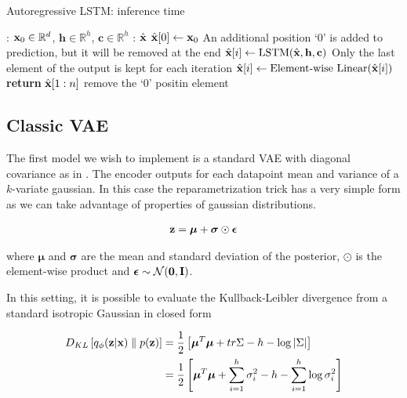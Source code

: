 \documentclass[12pt]{article}
\begin{document}
\begin{algorithm}
    \label{alg:autoregressive_LSTM_inference}
    \caption{Autoregressive LSTM: inference time}
    \begin{algorithmic}
        \Input: \(\textbf{x}_0 \in \mathbb{R}^d\), \(\mathbf{h} \in \mathbb{R}^h\), \(\mathbf{c} \in \mathbb{R}^h\)
        \Output: \(\hat{\textbf{x}}\)
        \State \(\hat{\textbf{x}}[0] \leftarrow \textbf{x}_0\) \Comment An additional position `0' is added to prediction, but it will be removed at the end
            \State \(\hat{\textbf{x}}[i] \leftarrow \text{LSTM}(\hat{\textbf{x}}, \mathbf{h}, \mathbf{c})\) \Comment Only the last element of the output is kept for each iteration
            \State \(\hat{\textbf{x}}[i] \leftarrow \text{Element-wise Linear}(\hat{\textbf{x}}[i])\)
        \EndFor
        \State \textbf{return} \(\hat{\textbf{x}}[1:n]\) \Comment remove the `0' positin element
    \end{algorithmic}
\end{algorithm}


\subsection{Classic VAE}

The first model we wish to implement is a standard VAE with diagonal covariance as in \cite{kingma2022autoencoding}. The encoder outputs for each datapoint mean and variance of a \(k\)-variate gaussian. In this case the reparametrization trick has a very simple form as we can take advantage of properties of gaussian distributions.

\begin{align}
    \textbf{z} = \boldsymbol{\mu} + \boldsymbol{\sigma} \odot \bm{\epsilon}
\end{align}

where \(\boldsymbol{\mu}\) and \(\boldsymbol{\sigma}\) are the mean and standard deviation of the posterior, \(\odot\) is the element-wise product and \(\bm{\epsilon} \sim \mathcal{N}(\textbf{0}, \textbf{I})\). 


In this setting, it is possible to evaluate the Kullback-Leibler divergence from a standard isotropic Gaussian in closed form

\begin{align}
    D_{KL} \left[ q_{\phi}(\textbf{z}|\textbf{x}) \parallel p(\textbf{z}) \right] &= \frac{1}{2}\left[\boldsymbol{\mu}^T \boldsymbol{\mu} + tr{\Sigma} - h - \log \left| \Sigma \right| \right] \nonumber \\
    &= \frac{1}{2}\left[\boldsymbol{\mu}^T \boldsymbol{\mu} + \sum_{i=1}^h \sigma_{i}^2 - h - \sum_{i=1}^h \log\sigma_{i}^2\right]
\end{align}
\end{document}
